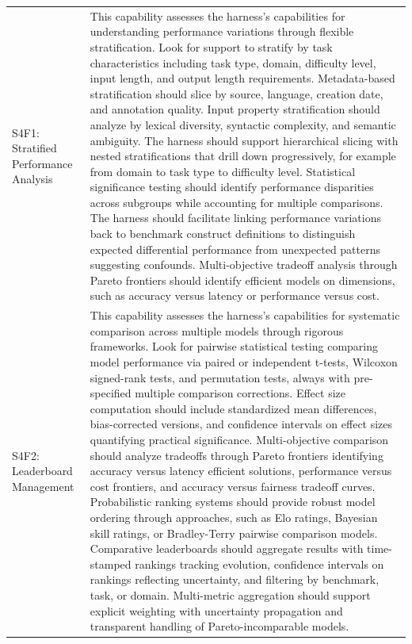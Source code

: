\begin{longtable}{>{\raggedright\arraybackslash}p{3cm}|>{\raggedright\arraybackslash}p{16cm}}
\multicolumn{2}{l}{\textbf{STAGE 4: INTERPRET \& RELEASE -- Analysis, Reporting \& Reproducibility (6 capabilities)}} \\
\hline

S4F1: Stratified Performance Analysis & This capability assesses the harness's capabilities for understanding performance variations through flexible stratification. Look for support to stratify by task characteristics including task type, domain, difficulty level, input length, and output length requirements. Metadata-based stratification should slice by source, language, creation date, and annotation quality. Input property stratification should analyze by lexical diversity, syntactic complexity, and semantic ambiguity. The harness should support hierarchical slicing with nested stratifications that drill down progressively, for example from domain to task type to difficulty level. Statistical significance testing should identify performance disparities across subgroups while accounting for multiple comparisons. The harness should facilitate linking performance variations back to benchmark construct definitions to distinguish expected differential performance from unexpected patterns suggesting confounds. Multi-objective tradeoff analysis through Pareto frontiers should identify efficient models on dimensions, such as accuracy versus latency or performance versus cost. \\
\hline

S4F2: Leaderboard Management & This capability assesses the harness's capabilities for systematic comparison across multiple models through rigorous frameworks. Look for pairwise statistical testing comparing model performance via paired or independent t-tests, Wilcoxon signed-rank tests, and permutation tests, always with pre-specified multiple comparison corrections. Effect size computation should include standardized mean differences, bias-corrected versions, and confidence intervals on effect sizes quantifying practical significance. Multi-objective comparison should analyze tradeoffs through Pareto frontiers identifying accuracy versus latency efficient solutions, performance versus cost frontiers, and accuracy versus fairness tradeoff curves. Probabilistic ranking systems should provide robust model ordering through approaches, such as Elo ratings, Bayesian skill ratings, or Bradley-Terry pairwise comparison models. Comparative leaderboards should aggregate results with time-stamped rankings tracking evolution, confidence intervals on rankings reflecting uncertainty, and filtering by benchmark, task, or domain. Multi-metric aggregation should support explicit weighting with uncertainty propagation and transparent handling of Pareto-incomparable models. \\
\hline


\end{longtable}
